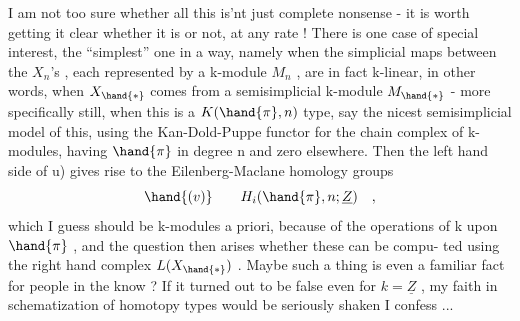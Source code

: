 
I am not too sure whether all this is'nt just complete nonsense -
it is worth getting it clear whether it is or not, at any rate ! There
is one case of special interest, the ``simplest'' one in a way, namely
when  the simplicial maps between the $X_n$'s , each represented by a
k-module $M_n$ , are in fact k-linear, in other words, when $X_{\hand{\ast}}$ comes
from a semisimplicial k-module $M_{\hand{\ast}}$ - more specifically still, when
this is a $K(\hand{\pi},n)$ type, say the nicest semisimplicial model of this,
using the Kan-Dold-Puppe functor for the chain complex of k-modules,
having $\hand{\pi}$ in degree n and zero elsewhere. Then the left hand side of u)
gives rise to the Eilenberg-Maclane homology groups
\[ \hand{(v)} \qquad H_i(\hand{\pi},n;\underline{Z}) \quad , \]
\margin{$\times$} which I guess should be k-modules a priori, because of the operations
of k upon $\hand{\pi}$ , and the question then arises whether these can be compu-%
ted using the right hand complex $L(X_{\hand{\ast}})$ . Maybe such a thing is even a
familiar fact for people in the know ? If it turned out to be false
even for $k=\underline{Z}$ , my faith in schematization of homotopy types would be
seriously shaken I confess ...

\hand{* * *}

